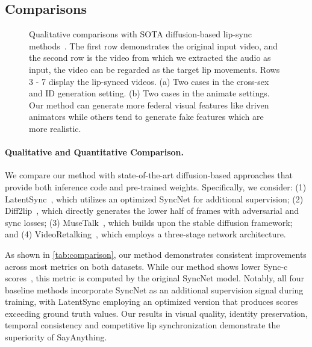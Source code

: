 \subsection{Comparisons}
\begin{figure*}[!htp]
    \centering
    \caption{Qualitative comparisons with SOTA diffusion-based lip-sync methods~\citep{mukhopadhyay2024diff2lip,zhang2024musetalk,li2024latentsync,cheng2022videoretalking}. The first row demonstrates the original input video, and the second row is the video from which we extracted the audio as input, the video can be regarded as the target lip movements. Rows 3 - 7 display the lip-synced videos.  (a) Two cases in the cross-sex and ID generation setting.  (b) Two cases in the animate settings. Our method can generate more federal visual features like driven animators while others tend to generate fake features which are more realistic.
}
    \label{fig:compare}
\end{figure*}

\paragraph{Qualitative and Quantitative Comparison.}
We compare our method with state-of-the-art diffusion-based approaches that provide both inference code and pre-trained weights. Specifically, we consider: (1) LatentSync~\citep{li2024latentsync}, which utilizes an optimized SyncNet for additional supervision; (2) Diff2lip~\citep{mukhopadhyay2024diff2lip}, which directly generates the lower half of frames with adversarial and sync losses; (3) MuseTalk~\citep{zhang2024musetalk}, which builds upon the stable diffusion framework; and (4) VideoRetalking~\citep{cheng2022videoretalking}, which employs a three-stage network architecture.

As shown in \cref{tab:comparison}, our method demonstrates consistent improvements across most metrics on both datasets. While our method shows lower Sync-c scores~\citep{chung2017out}, this metric is computed by the original SyncNet model. Notably, all four baseline methods incorporate SyncNet as an additional supervision signal during training, with LatentSync employing an optimized version that produces scores exceeding ground truth values. Our results in visual quality, identity preservation, temporal consistency and competitive lip synchronization demonstrate the superiority of SayAnything.


